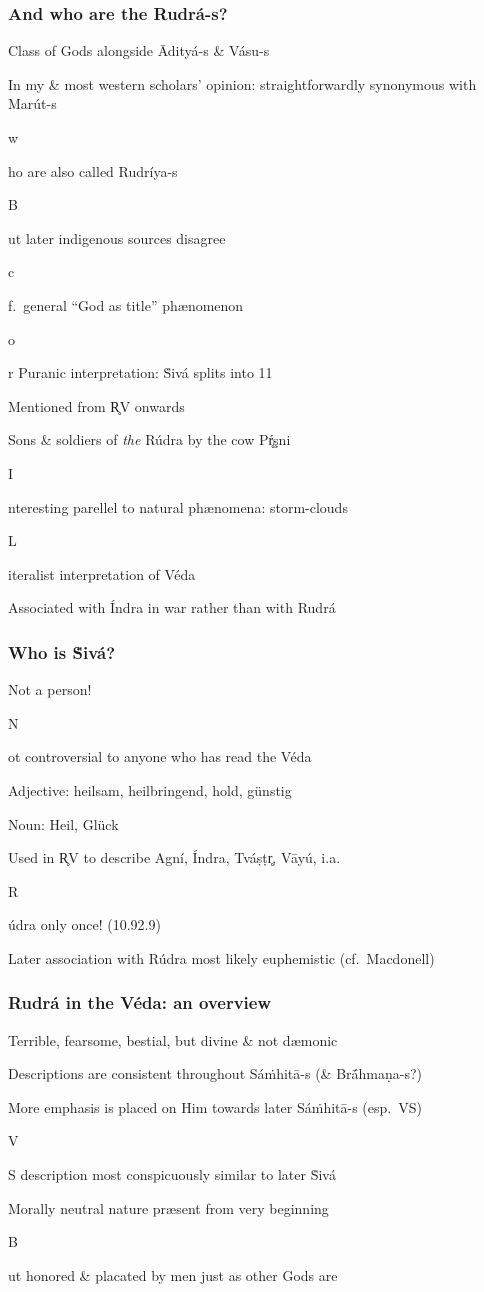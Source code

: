 \documentclass[pdf]{beamer}
\newcommand{\Subitem}[1]{{\setlength\itemindent{12pt} \item[-] #1}}
\newcommand{\Subsubitem}[1]{{\setlength\itemindent{24pt} \item[○] #1}}
\begin{document}
\begin{frame} \frametitle{And who are the Rudrá-s?}
\begin{itemize}
	\item Class of Gods alongside Ādityá-s \& Vásu-s
	\item In my \& most western scholars' opinion: straightforwardly synonymous with Marút-s
	\Subitem who are also called Rudríya-s
	\Subitem But later indigenous sources disagree
	\Subsubitem cf.~general ``God as title'' phænomenon
	\Subsubitem or Puranic interpretation: Ṡivá splits into 11
	\item Mentioned from R̥V onwards
	\item Sons \& soldiers of \emph{the} Rúdra by the cow Pŕ̥şni
	\Subitem Interesting parellel to natural phænomena: storm-clouds
	\Subitem Literalist interpretation of Véda
	\item Associated with Índra in war rather than with Rudrá
\end{itemize}
\end{frame}

\begin{frame} \frametitle{Who is Ṡivá?}
\begin{itemize}
	\item Not a person!
	\Subitem Not controversial to anyone who has read the Véda
	\item Adjective: \glqq heilsam, heilbringend, hold, günstig\grqq
	\item Noun: \glqq Heil, Glück\grqq
	\item Used in R̥V to describe Agní, Índra, Tváṣṭr̥, Vāyú, i.a.
	\Subitem Rúdra only once! (10.92.9)
	\item Later association with Rúdra most likely euphemistic (cf.~Macdonell)
\end{itemize}
\end{frame}

\begin{frame} \frametitle{Rudrá in the Véda: an overview}
\begin{itemize}
	\item Terrible, fearsome, bestial, but divine \& not dæmonic
	\item Descriptions are consistent throughout Sáṁhitā-s (\& Brā́hmaṇa-s?)
	\item More emphasis is placed on Him towards later Sáṁhitā-s (esp.~VS)
	\Subitem VS description most conspicuously similar to later Ṡivá
	\item Morally neutral nature præsent from very beginning
	\Subitem But honored \& placated by men just as other Gods are
\end{itemize}
\end{frame}
\end{document}

